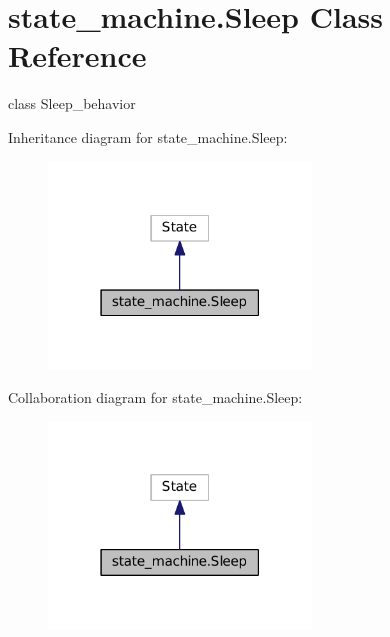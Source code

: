 \hypertarget{classstate__machine_1_1Sleep}{}\section{state\+\_\+machine.\+Sleep Class Reference}
\label{classstate__machine_1_1Sleep}


class Sleep\+\_\+behavior  




Inheritance diagram for state\+\_\+machine.\+Sleep\+:
\nopagebreak
\begin{figure}[H]
\begin{center}
\leavevmode
\includegraphics[width=198pt]{classstate__machine_1_1Sleep__inherit__graph}
\end{center}
\end{figure}


Collaboration diagram for state\+\_\+machine.\+Sleep\+:
\nopagebreak
\begin{figure}[H]
\begin{center}
\leavevmode
\includegraphics[width=198pt]{classstate__machine_1_1Sleep__coll__graph}
\end{center}
\end{figure}
